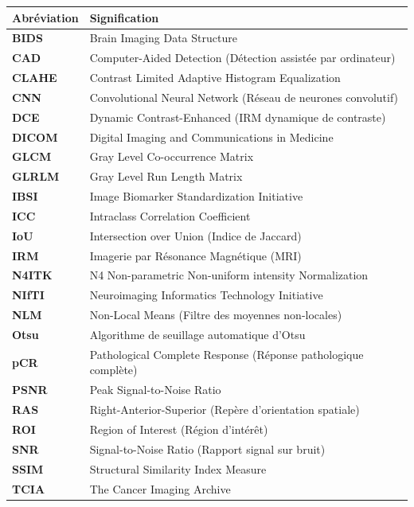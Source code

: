 \documentclass[12pt,a4paper]{report}
\begin{document}
	\begin{longtable}{@{}>{\bfseries\color{primaryblue}}l @{\hspace{1.5cm}} p{11cm}@{}}
		\toprule
		\textcolor{primaryblue}{Abréviation} & \textcolor{primaryblue}{Signification} \\
		\midrule
		\endhead
		\bottomrule
		\endfoot
		BIDS  & Brain Imaging Data Structure \\
		CAD   & Computer-Aided Detection (Détection assistée par ordinateur) \\
		CLAHE & Contrast Limited Adaptive Histogram Equalization \\
		CNN   & Convolutional Neural Network (Réseau de neurones convolutif) \\
		DCE   & Dynamic Contrast-Enhanced (IRM dynamique de contraste) \\
		DICOM & Digital Imaging and Communications in Medicine \\
		GLCM  & Gray Level Co-occurrence Matrix \\
		GLRLM & Gray Level Run Length Matrix \\
		IBSI  & Image Biomarker Standardization Initiative \\
		ICC   & Intraclass Correlation Coefficient \\
		IoU   & Intersection over Union (Indice de Jaccard) \\
		IRM   & Imagerie par Résonance Magnétique (MRI) \\
		N4ITK & N4 Non-parametric Non-uniform intensity Normalization \\
		NIfTI & Neuroimaging Informatics Technology Initiative \\
		NLM   & Non-Local Means (Filtre des moyennes non-locales) \\
		Otsu  & Algorithme de seuillage automatique d'Otsu \\
		pCR   & Pathological Complete Response (Réponse pathologique complète) \\
		PSNR  & Peak Signal-to-Noise Ratio \\
		RAS   & Right-Anterior-Superior (Repère d'orientation spatiale) \\
		ROI   & Region of Interest (Région d'intérêt) \\
		SNR   & Signal-to-Noise Ratio (Rapport signal sur bruit) \\
		SSIM  & Structural Similarity Index Measure \\
		TCIA  & The Cancer Imaging Archive \\
	\end{longtable}
	
\end{document}
